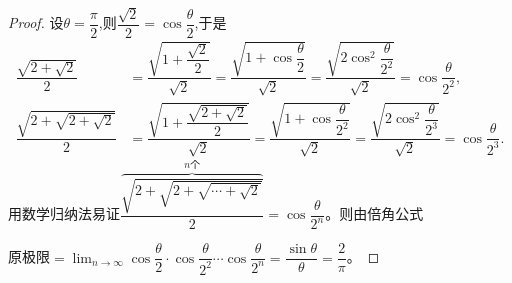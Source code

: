\begin{proof}
设$\theta=\dfrac{\pi}{2}$,则$\dfrac{\sqrt{2}}{2}=\cos\dfrac{\theta}{2}$,于是
\begin{align*}
\dfrac{\sqrt{2+\sqrt{2}}}{2}&=\dfrac{\sqrt{1+\dfrac{\sqrt{2}}{2}}}{\sqrt{2}}=\dfrac{\sqrt{1+\cos\dfrac{\theta}{2}}}{\sqrt{2}}=\dfrac{\sqrt{2\cos^2\dfrac{\theta}{2^2}}}{\sqrt{2}}=\cos\dfrac{\theta}{2^2},\\
\dfrac{\sqrt{2+\sqrt{2+\sqrt{2}}}}{2}&=\dfrac{\sqrt{1+\dfrac{\sqrt{2+\sqrt{2}}}{2}}}{\sqrt{2}}=\dfrac{\sqrt{1+\cos\dfrac{\theta}{2^2}}}{\sqrt{2}}=\dfrac{\sqrt{2\cos^2\dfrac{\theta}{2^3}}}{\sqrt{2}}=\cos\dfrac{\theta}{2^3}.
\end{align*}
用数学归纳法易证$\dfrac{\overbrace{\sqrt{2+\sqrt{2+\sqrt{\cdots+\sqrt{2}}}}}^{n\text{个}}}{2}=\cos\dfrac{\theta}{2^n}$。则由倍角公式

原极限$=\lim_{n\to\infty}\cos\dfrac{\theta}{2}\cdot\cos\dfrac{\theta}{2^2}\cdots\cos\dfrac{\theta}{2^n}=\dfrac{\sin\theta}{\theta}=\dfrac{2}{\pi}$。
\end{proof}



